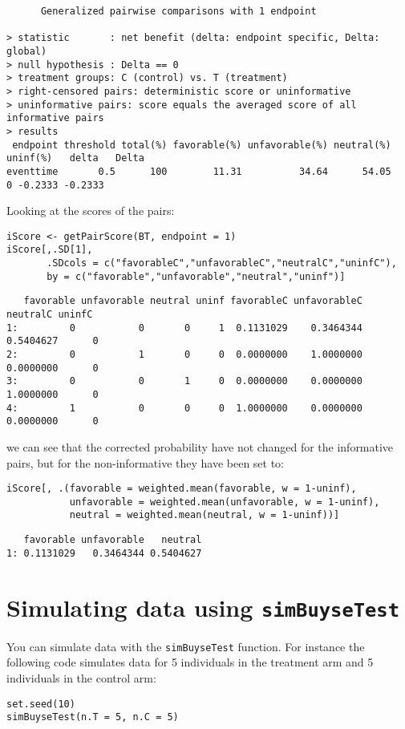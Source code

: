 \documentclass[12pt]{article}
\begin{document}
\begin{verbatim}
      Generalized pairwise comparisons with 1 endpoint

> statistic       : net benefit (delta: endpoint specific, Delta: global) 
> null hypothesis : Delta == 0 
> treatment groups: C (control) vs. T (treatment) 
> right-censored pairs: deterministic score or uninformative
> uninformative pairs: score equals the averaged score of all informative pairs
> results
 endpoint threshold total(%) favorable(%) unfavorable(%) neutral(%) uninf(%)   delta   Delta
eventtime       0.5      100        11.31          34.64      54.05        0 -0.2333 -0.2333
\end{verbatim}


Looking at the scores of the pairs:
\lstset{language=r,label= ,caption= ,captionpos=b,numbers=none}
\begin{lstlisting}
iScore <- getPairScore(BT, endpoint = 1)
iScore[,.SD[1], 
	   .SDcols = c("favorableC","unfavorableC","neutralC","uninfC"),
	   by = c("favorable","unfavorable","neutral","uninf")]
\end{lstlisting}

\begin{verbatim}
   favorable unfavorable neutral uninf favorableC unfavorableC  neutralC uninfC
1:         0           0       0     1  0.1131029    0.3464344 0.5404627      0
2:         0           1       0     0  0.0000000    1.0000000 0.0000000      0
3:         0           0       1     0  0.0000000    0.0000000 1.0000000      0
4:         1           0       0     0  1.0000000    0.0000000 0.0000000      0
\end{verbatim}

we can see that the corrected probability have not changed for the
informative pairs, but for the non-informative they have been set to:
\lstset{language=r,label= ,caption= ,captionpos=b,numbers=none}
\begin{lstlisting}
iScore[, .(favorable = weighted.mean(favorable, w = 1-uninf), 
		   unfavorable = weighted.mean(unfavorable, w = 1-uninf), 
		   neutral = weighted.mean(neutral, w = 1-uninf))]
\end{lstlisting}

\begin{verbatim}
   favorable unfavorable   neutral
1: 0.1131029   0.3464344 0.5404627
\end{verbatim}

\clearpage

\section{Simulating data using \texttt{simBuyseTest}}
\label{sec:org51a4e4a}
You can simulate data with the \texttt{simBuyseTest} function. For instance
the following code simulates data for 5 individuals in the treatment
arm and 5 individuals in the control arm:
\lstset{language=r,label= ,caption= ,captionpos=b,numbers=none}
\begin{lstlisting}
set.seed(10)
simBuyseTest(n.T = 5, n.C = 5)
\end{lstlisting}
\end{document}

